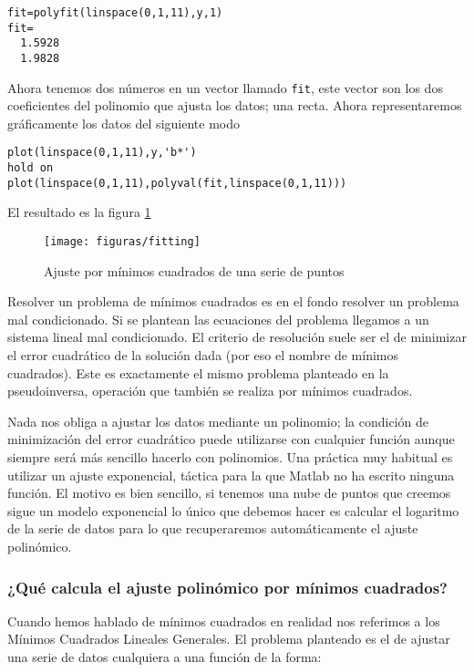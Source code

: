 \begin{verbatim}
fit=polyfit(linspace(0,1,11),y,1)
fit=
  1.5928
  1.9828
\end{verbatim}
Ahora tenemos dos números en un vector llamado \texttt{fit}, este
vector son los dos coeficientes del polinomio que ajusta los datos;
una recta. Ahora representaremos gráficamente los datos del siguiente
modo

\begin{verbatim}
plot(linspace(0,1,11),y,'b*')
hold on
plot(linspace(0,1,11),polyval(fit,linspace(0,1,11)))
\end{verbatim}
El resultado es la figura \ref{cap:Ajuste por minimos cuadrados}

%
\begin{figure}[h]
  \centering{}

  \texttt{[image: figuras/fitting]}


\caption{\label{cap:Ajuste por minimos cuadrados}Ajuste por mínimos cuadrados
de una serie de puntos}
\end{figure}


Resolver un problema de mínimos cuadrados es en el fondo resolver
un problema mal condicionado. Si se plantean las ecuaciones del problema
llegamos a un sistema lineal mal condicionado. El criterio de resolución
suele ser el de minimizar el error cuadrático de la solución dada
(por eso el nombre de mínimos cuadrados). Este es exactamente el mismo
problema planteado en la pseudoinversa, operación que también se realiza
por mínimos cuadrados.

Nada nos obliga a ajustar los datos mediante un polinomio; la condición
de minimización del error cuadrático puede utilizarse con cualquier
función aunque siempre será más sencillo hacerlo con polinomios. Una
práctica muy habitual es utilizar un ajuste exponencial, táctica para
la que Matlab no ha escrito ninguna función. El motivo es bien sencillo,
si tenemos una nube de puntos que creemos sigue un modelo exponencial
lo único que debemos hacer es calcular el logaritmo de la serie de
datos para lo que recuperaremos automáticamente el ajuste polinómico.


\subsubsection{¿Qué calcula el ajuste polinómico por mínimos cuadrados?
  \label{sub:=BFQu=E9-calcula-el}}

Cuando hemos hablado de mínimos cuadrados en realidad nos referimos a
los Mínimos Cuadrados Lineales Generales. El problema planteado es el
de ajustar una serie de datos cualquiera a una función de la forma:


